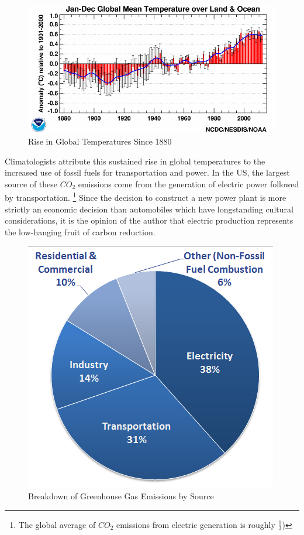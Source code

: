 \documentclass[12pt]{article}
\begin{document}
\begin{figure}[H]
	\begin{center}
	\includegraphics[scale = .4]{meantemp.png}
	\caption{Rise in Global Temperatures Since 1880 \cite{Temps}}
	\end{center}
\end{figure}

Climatologists attribute this sustained rise in global temperatures to the increased use of fossil fuels for transportation and power. In the US, the largest source of these $CO_{2}$ emissions come from the generation of electric power followed by transportation. \footnote{The global average of $CO_{2}$ emissions from electric generation is roughly $\frac{1}{3}$)} Since the decision to construct a new power plant is more strictly an economic decision than automobiles which have longstanding cultural considerations, it is the opinion of the author that electric production represents the low-hanging fruit of carbon reduction.  

\begin{figure}[H]
	\begin{center}
	\includegraphics[scale = .4]{gases-co2.png}
	\caption{Breakdown of Greenhouse Gas Emissions by Source \cite{co2}}
	\end{center}
\end{figure}
\end{document}

